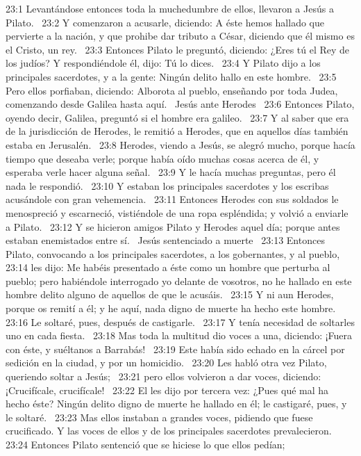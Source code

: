 23:1 Levantándose entonces toda la muchedumbre de ellos, llevaron a Jesús a Pilato.  
23:2 Y comenzaron a acusarle, diciendo: A éste hemos hallado que pervierte a la nación, y que prohibe dar tributo a César, diciendo que él mismo es el Cristo, un rey.  
23:3 Entonces Pilato le preguntó, diciendo: ¿Eres tú el Rey de los judíos? Y respondiéndole él, dijo: Tú lo dices.  
23:4 Y Pilato dijo a los principales sacerdotes, y a la gente: Ningún delito hallo en este hombre.  
23:5 Pero ellos porfiaban, diciendo: Alborota al pueblo, enseñando por toda Judea, comenzando desde Galilea hasta aquí.  
Jesús ante Herodes  
23:6 Entonces Pilato, oyendo decir, Galilea, preguntó si el hombre era galileo.  
23:7 Y al saber que era de la jurisdicción de Herodes, le remitió a Herodes, que en aquellos días también estaba en Jerusalén.  
23:8 Herodes, viendo a Jesús, se alegró mucho, porque hacía tiempo que deseaba verle; porque había oído muchas cosas acerca de él, y esperaba verle hacer alguna señal.  
23:9 Y le hacía muchas preguntas, pero él nada le respondió.  
23:10 Y estaban los principales sacerdotes y los escribas acusándole con gran vehemencia.  
23:11 Entonces Herodes con sus soldados le menospreció y escarneció, vistiéndole de una ropa espléndida; y volvió a enviarle a Pilato.  
23:12 Y se hicieron amigos Pilato y Herodes aquel día; porque antes estaban enemistados entre sí.  
Jesús sentenciado a muerte   
23:13 Entonces Pilato, convocando a los principales sacerdotes, a los gobernantes, y al pueblo,  
23:14 les dijo: Me habéis presentado a éste como un hombre que perturba al pueblo; pero habiéndole interrogado yo delante de vosotros, no he hallado en este hombre delito alguno de aquellos de que le acusáis.  
23:15 Y ni aun Herodes, porque os remití a él; y he aquí, nada digno de muerte ha hecho este hombre.  
23:16 Le soltaré, pues, después de castigarle.  
23:17 Y tenía necesidad de soltarles uno en cada fiesta.  
23:18 Mas toda la multitud dio voces a una, diciendo: ¡Fuera con éste, y suéltanos a Barrabás!  
23:19 Este había sido echado en la cárcel por sedición en la ciudad, y por un homicidio.  
23:20 Les habló otra vez Pilato, queriendo soltar a Jesús;  
23:21 pero ellos volvieron a dar voces, diciendo: ¡Crucifícale, crucifícale!  
23:22 El les dijo por tercera vez: ¿Pues qué mal ha hecho éste? Ningún delito digno de muerte he hallado en él; le castigaré, pues, y le soltaré.  
23:23 Mas ellos instaban a grandes voces, pidiendo que fuese crucificado. Y las voces de ellos y de los principales sacerdotes prevalecieron.  
23:24 Entonces Pilato sentenció que se hiciese lo que ellos pedían;  
